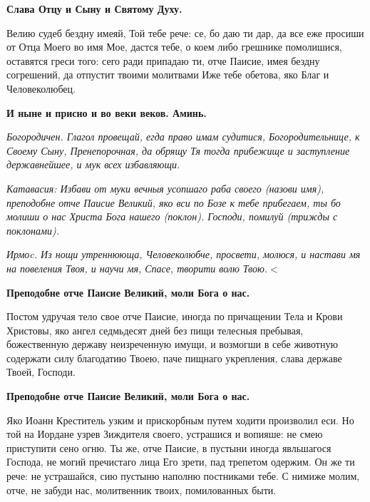 \bfseries Слава Отцу и Сыну и Святому Духу.\normalfont{}




Велию судеб бездну имеяй, Той тебе рече: се, бо даю ти дар, да все еже просиши от Отца Моего во имя Мое, дастся тебе, о коем либо грешнике
помолишися, оставятся греси того: сего ради припадаю ти, отче Паисие, имея бездну согрешений, да отпустит твоими молитвами Иже тебе обетова, яко Благ и Человеколюбец. 




\bfseries И ныне и присно и во веки веков. Аминь.\normalfont{}




\itshape Богородичен.\normalfont{} Глагол провещай, егда право имам судитися, Богородительнице, к Своему Сыну, Пренепорочная, да обрящу Тя тогда прибежище и заступление державнейшее, и мук всех избавляющи. 




\itshape Катавасия:\normalfont{} Избави от муки вечныя усопшаго раба своего (\itshape назови имя\normalfont{}), преподобне отче Паисие Великий, яко вси по Бозе к тебе прибегаем, ты бо молиши о нас Христа Бога нашего (\itshape поклон\normalfont{}). Господи, помилуй (\itshape трижды с поклонами\normalfont{}). 








\itshape Ирмоc.\normalfont{} Из нощи утреннююща, Человеколюбче, просвети, молюся, и настави мя на повеления Твоя, и научи мя, Спасе, творити волю Твою.$<$ 




\bfseries Преподобне отче Паисие Великий, моли Бога о нас. \normalfont{}




Постом удручая тело свое отче Паисие, иногда по причащении Тела и Крови Христовы, яко ангел седмьдесят дней без пищи телесныя пребывая, божественную державу неизреченную имущи, и возмогши в себе животную содержати силу благодатию Твоею, паче пищнаго укрепления, слава державе Твоей, Господи. 




\bfseries Преподобне отче Паисие Великий, моли Бога о нас. \normalfont{}




Яко Иоанн Креститель узким и прискорбным путем ходити произволил еси. Но той на Иордане узрев Зиждителя своего, устрашися и вопияше: не смею приступити сено огню. Ты же, отче Паисие, в пустыни иногда явльшагося Господа, не могий пречистаго лица Его зрети, пад трепетом одержим. Он же ти рече: не устрашайся, сию пустыню наполню постниками тебе. С нимиже молим, отче, не забуди нас, молитвенник твоих, помилованных быти. 




